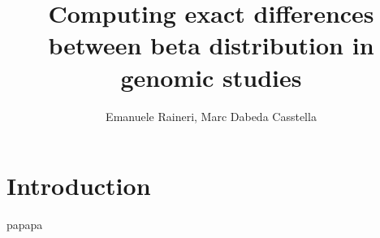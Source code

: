 \documentclass{amsart}
\title{Computing exact differences between beta distribution in genomic studies}
\author{Emanuele Raineri, Marc Dabeda Casstella}
\begin{document}
\section{Introduction}
papapa
\section{}
\end{document}
